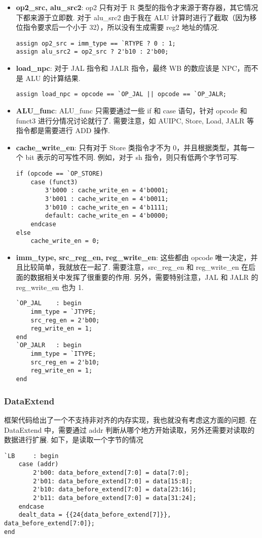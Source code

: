 \documentclass{article}
\begin{document}
\begin{itemize}
  \item
    \textbf{op2\_src, alu\_src2}: op2 只有对于 R 类型的指令才来源于寄存器，其它情况下都来源于立即数. 对于 alu\_src2 由于我在 ALU 计算时进行了截取（因为移位指令要求后一个小于 32），所以没有生成需要 reg2 地址的情况.
    \begin{verbatim}
assign op2_src = imm_type == `RTYPE ? 0 : 1;
assign alu_src2 = op2_src ? 2'b10 : 2'b00;
    \end{verbatim}
  \item
    \textbf{load\_npc}: 对于 JAL 指令和 JALR 指令，最终 WB 的数应该是 NPC，而不是 ALU 的计算结果.
    \begin{verbatim}
assign load_npc = opcode == `OP_JAL || opcode == `OP_JALR;
    \end{verbatim}
  \item
    \textbf{ALU\_func}: ALU\_func 只需要通过一些 if 和 case 语句，针对 opcode 和 funct3 进行分情况讨论就行了. 需要注意，如 AUIPC, Store, Load, JALR 等指令都是需要进行 ADD 操作.
  \item
    \textbf{cache\_write\_en}: 只有对于 Store 类指令才不为 0，并且根据类型，其每一个 bit 表示的可写性不同. 例如，对于 sh 指令，则只有低两个字节可写.
    \begin{verbatim}
if (opcode == `OP_STORE)
    case (funct3)
        3'b000 : cache_write_en = 4'b0001;
        3'b001 : cache_write_en = 4'b0011;
        3'b010 : cache_write_en = 4'b1111;
        default: cache_write_en = 4'b0000;
    endcase
else
    cache_write_en = 0;
    \end{verbatim}
  \item
    \textbf{imm\_type, src\_reg\_en, reg\_write\_en}: 这些都由 opcode 唯一决定，并且比较简单，我就放在一起了. 需要注意，src\_reg\_en 和 reg\_write\_en 在后面的数据相关中发挥了很重要的作用. 另外，需要特别注意，JAL 和 JALR 的 reg\_write\_en 也为 1.
    \begin{verbatim}
`OP_JAL    : begin
    imm_type = `JTYPE;
    src_reg_en = 2'b00;
    reg_write_en = 1;
end
`OP_JALR   : begin
    imm_type = `ITYPE;
    src_reg_en = 2'b10;
    reg_write_en = 1;
end
    \end{verbatim}
\end{itemize}

\subsubsection{DataExtend}
框架代码给出了一个不支持非对齐的内存实现，我也就没有考虑这方面的问题. 在 DataExtend 中，需要通过 addr 判断从哪个地方开始读取，另外还需要对读取的数据进行扩展. 如下，是读取一个字节的情况
\begin{verbatim}
`LB     : begin
    case (addr)
        2'b00: data_before_extend[7:0] = data[7:0];
        2'b01: data_before_extend[7:0] = data[15:8];
        2'b10: data_before_extend[7:0] = data[23:16];
        2'b11: data_before_extend[7:0] = data[31:24];
    endcase
    dealt_data = {{24{data_before_extend[7]}}, data_before_extend[7:0]};
end
\end{verbatim}
\end{document}
